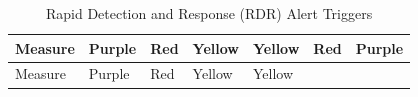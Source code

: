 \documentclass[
  a4paper,
  ,captions=tableheading
]{scrartcl}
\begin{document}
\begin{longtable}[]{@{}
  >{\raggedright\arraybackslash}p{}
  >{\centering\arraybackslash}p{}
  >{\centering\arraybackslash}p{}
  >{\centering\arraybackslash}p{}
  >{\centering\arraybackslash}p{}
  >{\centering\arraybackslash}p{}
  >{\centering\arraybackslash}p{}@{}}
\caption{\label{tbl:table1}Rapid Detection and Response (RDR) Alert
Triggers}\tabularnewline
\toprule\noalign{}
\begin{minipage}[b]{\linewidth}\raggedright
Measure
\end{minipage} & \begin{minipage}[b]{\linewidth}\centering
Purple
\end{minipage} & \begin{minipage}[b]{\linewidth}\centering
Red
\end{minipage} & \begin{minipage}[b]{\linewidth}\centering
Yellow
\end{minipage} & \begin{minipage}[b]{\linewidth}\centering
Yellow
\end{minipage} & \begin{minipage}[b]{\linewidth}\centering
Red
\end{minipage} & \begin{minipage}[b]{\linewidth}\centering
Purple
\end{minipage} \\
\midrule\noalign{}
\endfirsthead
\toprule\noalign{}
\begin{minipage}[b]{\linewidth}\raggedright
Measure
\end{minipage} & \begin{minipage}[b]{\linewidth}\centering
Purple
\end{minipage} & \begin{minipage}[b]{\linewidth}\centering
Red
\end{minipage} & \begin{minipage}[b]{\linewidth}\centering
Yellow
\end{minipage} & \begin{minipage}[b]{\linewidth}\centering
Yellow
\end{minipage} & \begin{minipage}[b]{\linewidth}\centering

\end{minipage}
\end{longtable}
\end{document}
